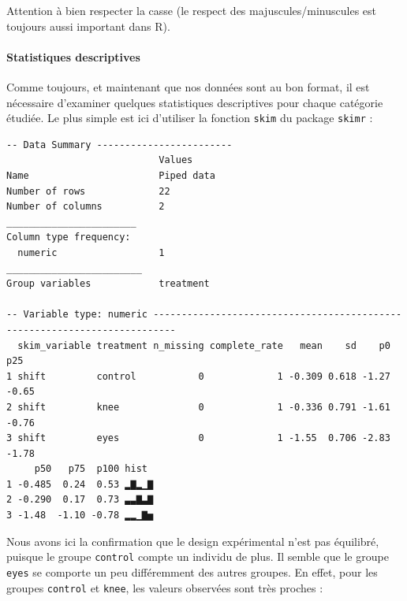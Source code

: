 \documentclass[a4paperpaper,]{article}
\newenvironment{Shaded}{\begin{snugshade}}{\end{snugshade}}
\newcommand{\KeywordTok}[1]{\textcolor[rgb]{0.12,0.11,0.11}{\textbf{#1}}}
\newcommand{\NormalTok}[1]{\textcolor[rgb]{0.12,0.11,0.11}{#1}}
\newcommand{\OperatorTok}[1]{\textcolor[rgb]{0.12,0.11,0.11}{#1}}
\newcommand{\StringTok}[1]{\textcolor[rgb]{0.75,0.01,0.01}{#1}}
\let\oldparagraph\paragraph
\renewcommand{\paragraph}[1]{\oldparagraph{#1}\mbox{}}
\begin{document}
Attention à bien respecter la casse (le respect des majuscules/minuscules est toujours aussi important dans R).

\hypertarget{statistiques-descriptives-3}{%
\paragraph{Statistiques descriptives}\label{statistiques-descriptives-3}}

Comme toujours, et maintenant que nos données sont au bon format, il est nécessaire d'examiner quelques statistiques descriptives pour chaque catégorie étudiée. Le plus simple est ici d'utiliser la fonction \texttt{skim} du package \texttt{skimr} :

\begin{Shaded}
\end{Shaded}

\begin{verbatim}
-- Data Summary ------------------------
                           Values    
Name                       Piped data
Number of rows             22        
Number of columns          2         
_______________________              
Column type frequency:               
  numeric                  1         
________________________             
Group variables            treatment 

-- Variable type: numeric --------------------------------------------------------------------------
  skim_variable treatment n_missing complete_rate   mean    sd    p0   p25
1 shift         control           0             1 -0.309 0.618 -1.27 -0.65
2 shift         knee              0             1 -0.336 0.791 -1.61 -0.76
3 shift         eyes              0             1 -1.55  0.706 -2.83 -1.78
     p50   p75  p100 hist 
1 -0.485  0.24  0.53 ▂▇▂▁▇
2 -0.290  0.17  0.73 ▃▃▇▃▇
3 -1.48  -1.10 -0.78 ▂▂▁▇▅
\end{verbatim}

Nous avons ici la confirmation que le design expérimental n'est pas équilibré, puisque le groupe \texttt{control} compte un individu de plus. Il semble que le groupe \texttt{eyes} se comporte un peu différemment des autres groupes. En effet, pour les groupes \texttt{control} et \texttt{knee}, les valeurs observées sont très proches :
\end{document}
